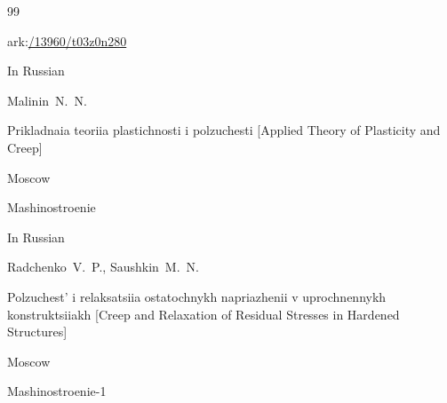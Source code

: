 \begin{thebibliography}{99}

\elink ark:\href{https://archive.org/details/ElsgoltsDifferentialEquationsAndTheCalculusOfVariations}{/13960/t03z0n280}




\lang In Russian

\by Malinin~N.~N.

\book Prikladnaia teoriia plastichnosti i polzuchesti \rm [Applied Theory of Plasticity and Creep]

\publaddr Moscow

\publ Mashinostroenie






\lang In Russian

\by Radchenko~V.~P., Saushkin~M.~N.

\book Polzuchest' i relaksatsiia ostatochnykh napriazhenii v uprochnennykh konstruktsiiakh \rm [Creep and Relaxation of Residual Stresses in Hardened Structures]

\publaddr Moscow

\publ Mashinostroenie-1









\end{thebibliography}



\EngDate







\newpage

\Russian 

 

%


%

%

